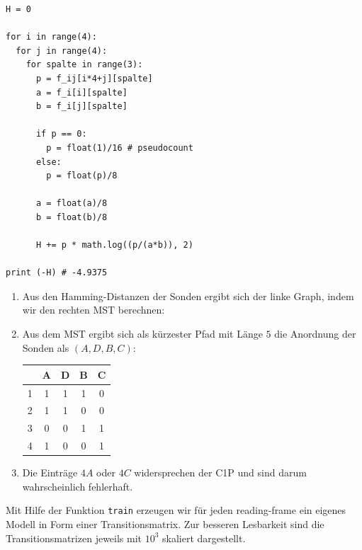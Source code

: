 \documentclass{homework}
\begin{document}
\begin{enumerate}
\begin{itemize}
\begin{verbatim}
H = 0

for i in range(4):
  for j in range(4): 
    for spalte in range(3):
      p = f_ij[i*4+j][spalte]
      a = f_i[i][spalte]
      b = f_i[j][spalte]
      
      if p == 0:
        p = float(1)/16 # pseudocount
      else:
        p = float(p)/8
      
      a = float(a)/8
      b = float(b)/8
      
      H += p * math.log((p/(a*b)), 2)
      
print (-H) # -4.9375
\end{verbatim}	
	
\end{itemize}

\begin{enumerate}

\item Aus den Hamming-Distanzen der Sonden ergibt sich der linke Graph, indem wir den rechten MST berechnen:

\newpage


\item Aus dem MST ergibt sich als kürzester Pfad mit Länge $5$ die Anordnung der Sonden als $(A,D,B,C)$:

\begin{tabular}{l|cccc}
	& A	& D	& B	& C\\\hline
1	& 1	& 1	& 1	& 0\\
2	& 1	& 1	& 0	& 0\\
3	& 0	& 0	& 1	& 1\\
4	& 1	& 0	& 0	& 1
\end{tabular}

\item Die Einträge $4A$ oder $4C$ widersprechen der C1P und sind darum wahrscheinlich fehlerhaft.

\end{enumerate}


Mit Hilfe der Funktion \texttt{train} erzeugen wir für jeden reading-frame ein eigenes Modell in Form einer Transitionsmatrix.
Zur besseren Lesbarkeit sind die Transitionsmatrizen jeweils mit $10^3$ skaliert dargestellt.


\end{enumerate}
\end{document}
